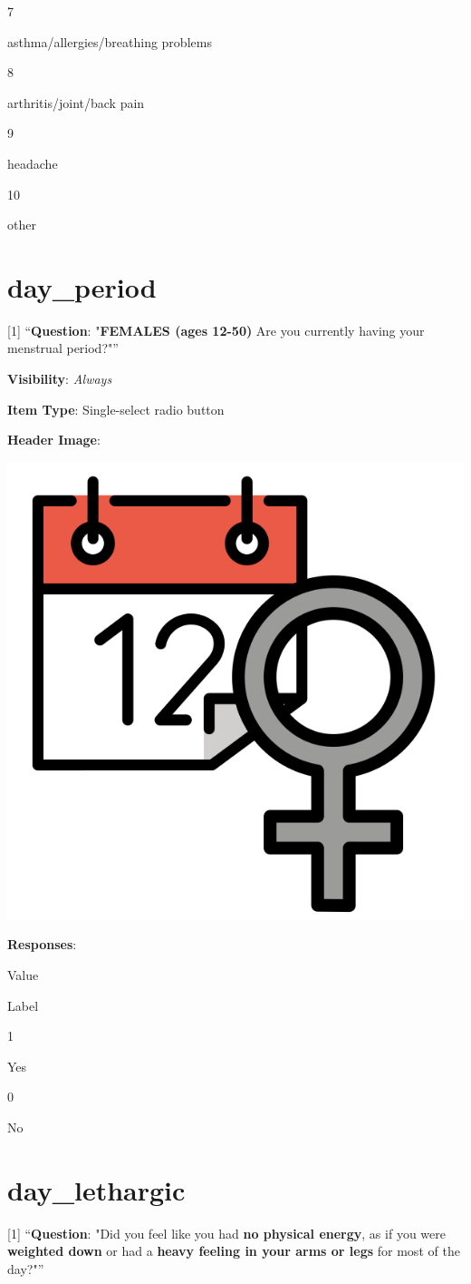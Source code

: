 \documentclass[]{book}
\begin{document}
7

asthma/allergies/breathing problems

8

arthritis/joint/back pain

9

headache

10

other

\hypertarget{day_period}{%
\section{day\_period}\label{day_period}}

{[}1{]} ``\textbf{Question}: "\textbf{FEMALES (ages 12-50)} Are you currently having your menstrual period?"''

\textbf{Visibility}: \emph{Always}

\textbf{Item Type}: Single-select radio button

\textbf{Header Image}:

\begin{flushleft}\includegraphics[width=0.33\linewidth]{downloadFigs4latex_NIMH_Applet_Codebook/day_period_headerImg} \end{flushleft}

\textbf{Responses}:

Value

Label

1

Yes

0

No

\hypertarget{day_lethargic}{%
\section{day\_lethargic}\label{day_lethargic}}

{[}1{]} ``\textbf{Question}: "Did you feel like you had \textbf{no physical energy}, as if you were \textbf{weighted down} or had a \textbf{heavy feeling in your arms or legs} for most of the day?"''
\end{document}
